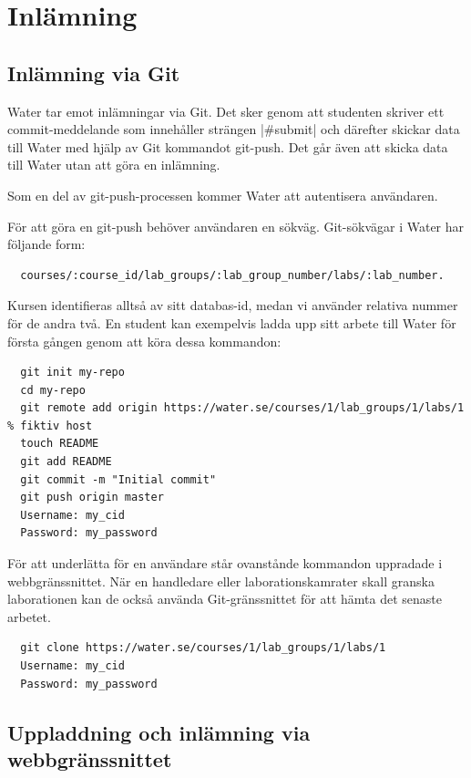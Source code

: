 \section{Inlämning}
\subsection{Inlämning via Git}

Water tar emot inlämningar via Git. Det sker genom att studenten skriver ett commit-meddelande som innehåller strängen |\#submit| och därefter skickar data till Water med hjälp av Git kommandot git-push. Det går även att skicka data till Water utan att göra en inlämning.

Som en del av git-push-processen kommer Water att autentisera användaren. 

För att göra en git-push behöver användaren en sökväg.
Git-sökvägar i Water har följande form:

\begin{verbatim}
  courses/:course_id/lab_groups/:lab_group_number/labs/:lab_number.
\end{verbatim}

Kursen identifieras alltså av sitt databas-id, medan vi använder relativa nummer för de andra två. En student kan exempelvis ladda upp sitt arbete till Water för första gången genom att köra dessa kommandon:

\begin{verbatim}
  git init my-repo
  cd my-repo
  git remote add origin https://water.se/courses/1/lab_groups/1/labs/1 % fiktiv host
  touch README
  git add README
  git commit -m "Initial commit"
  git push origin master
  Username: my_cid
  Password: my_password  
\end{verbatim}

För att underlätta för en användare står ovanstånde kommandon uppradade i webbgränssnittet. När en handledare eller laborationskamrater skall granska laborationen kan de också använda Git-gränssnittet för att hämta det senaste arbetet.

\begin{BVerbatim}
  git clone https://water.se/courses/1/lab_groups/1/labs/1
  Username: my_cid
  Password: my_password
\end{BVerbatim}
\nopagebreak

\subsection{Uppladdning och inlämning via webbgränssnittet}

